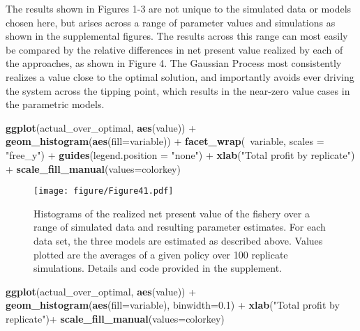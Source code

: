 \documentclass[author-year, review]{elsarticle} %
\makeatletter
\newenvironment{Shaded}{}{}
\newcommand{\KeywordTok}[1]{\textcolor[rgb]{0.00,0.44,0.13}{\textbf{{#1}}}}
\newcommand{\DataTypeTok}[1]{\textcolor[rgb]{0.56,0.13,0.00}{{#1}}}
\newcommand{\FloatTok}[1]{\textcolor[rgb]{0.25,0.63,0.44}{{#1}}}
\newcommand{\StringTok}[1]{\textcolor[rgb]{0.25,0.44,0.63}{{#1}}}
\newcommand{\NormalTok}[1]{{#1}}
\def\maxwidth{\ifdim\Gin@nat@width>\linewidth\linewidth
\else\Gin@nat@width\fi}
\let\Oldincludegraphics\includegraphics
\renewcommand{\includegraphics}[1]{\Oldincludegraphics[width=\maxwidth]{#1}}
\makeatother
\begin{document}
The results shown in Figures 1-3 are not unique to the simulated data or
models chosen here, but arises across a range of parameter values and
simulations as shown in the supplemental figures. The results across
this range can most easily be compared by the relative differences in
net present value realized by each of the approaches, as shown in Figure
4. The Gaussian Process most consistently realizes a value close to the
optimal solution, and importantly avoids ever driving the system across
the tipping point, which results in the near-zero value cases in the
parametric models.

\begin{Shaded}
\begin{Highlighting}[]
\KeywordTok{ggplot}\NormalTok{(actual_over_optimal, }\KeywordTok{aes}\NormalTok{(value)) + }\KeywordTok{geom_histogram}\NormalTok{(}\KeywordTok{aes}\NormalTok{(}\DataTypeTok{fill=}\NormalTok{variable)) + }
  \KeywordTok{facet_wrap}\NormalTok{(~variable, }\DataTypeTok{scales =} \StringTok{"free_y"}\NormalTok{)  + }\KeywordTok{guides}\NormalTok{(}\DataTypeTok{legend.position =} \StringTok{"none"}\NormalTok{) +}
  \KeywordTok{xlab}\NormalTok{(}\StringTok{"Total profit by replicate"}\NormalTok{) + }\KeywordTok{scale_fill_manual}\NormalTok{(}\DataTypeTok{values=}\NormalTok{colorkey)}
\end{Highlighting}
\end{Shaded}

\begin{figure}[htbp]
\centering
\texttt{[image: figure/Figure41.pdf]}
\caption{Histograms of the realized net present value of the fishery
over a range of simulated data and resulting parameter estimates. For
each data set, the three models are estimated as described above. Values
plotted are the averages of a given policy over 100 replicate
simulations. Details and code provided in the supplement.}
\end{figure}

\begin{Shaded}
\begin{Highlighting}[]

\KeywordTok{ggplot}\NormalTok{(actual_over_optimal, }\KeywordTok{aes}\NormalTok{(value)) + }\KeywordTok{geom_histogram}\NormalTok{(}\KeywordTok{aes}\NormalTok{(}\DataTypeTok{fill=}\NormalTok{variable), }\DataTypeTok{binwidth=}\FloatTok{0.1}\NormalTok{) + }
  \KeywordTok{xlab}\NormalTok{(}\StringTok{"Total profit by replicate"}\NormalTok{)+ }\KeywordTok{scale_fill_manual}\NormalTok{(}\DataTypeTok{values=}\NormalTok{colorkey)}
\end{Highlighting}
\end{Shaded}
\end{document}
